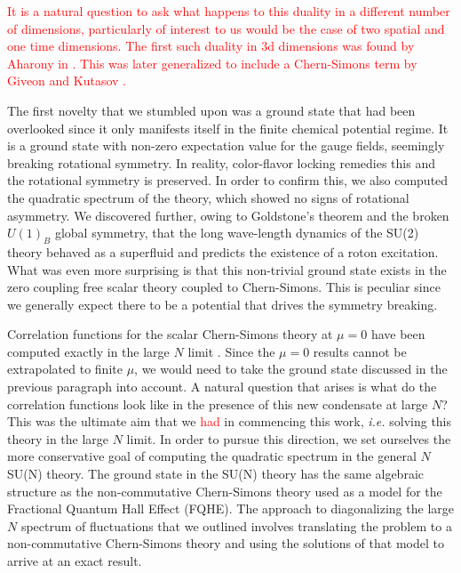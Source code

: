 \textcolor{red}{It is a natural question to ask what happens to this duality in a different number of dimensions, particularly of interest to us would be the case of two spatial and one time dimensions. The first such duality in 3d dimensions was found by Aharony in \cite{Aharony:1997gp}. This was later generalized to include a Chern-Simons term by Giveon and Kutasov \cite{Giveon:2008zn}. \cite{Benini:2011m}}

The first novelty that we stumbled upon was a ground state that had been overlooked since it only manifests itself in the finite chemical potential regime. It is a ground state with non-zero expectation value for the gauge fields, seemingly breaking rotational symmetry. In reality, color-flavor locking remedies this and the rotational symmetry is preserved. In order to confirm this, we also computed the quadratic spectrum of the theory, which showed no signs of rotational asymmetry. We discovered further, owing to Goldstone's theorem and the broken $U(1)_B$ global symmetry, that the long wave-length dynamics of the SU(2) theory behaved as a superfluid and predicts the existence of a roton excitation. What was even more surprising is that this non-trivial ground state exists in the zero coupling free scalar theory coupled to Chern-Simons. This is peculiar since we generally expect there to be a potential that drives the symmetry breaking.

Correlation functions for the scalar Chern-Simons theory at $\mu=0$ have been computed exactly in the large $N$ limit \cite{Aharony:2012nh}. Since the $\mu =0$ results cannot be extrapolated to finite $\mu$, we would need to take the ground state discussed in the previous paragraph into account. A natural question that arises is what do the correlation functions look like in the presence of this new condensate at large $N$? This was the ultimate aim that we \textcolor{red}{had} in commencing this work, \textit{i.e.} solving this theory in the large $N$ limit. In order to pursue this direction, we set ourselves the more conservative goal of computing the quadratic spectrum in the general $N$ SU(N) theory. The ground state in the SU(N) theory has the same algebraic structure as the non-commutative Chern-Simons theory used as a model for the Fractional Quantum Hall Effect (FQHE). The approach to diagonalizing the large $N$ spectrum of fluctuations that we outlined involves translating the problem to a non-commutative Chern-Simons theory and using the solutions of that model to arrive at an exact result.


